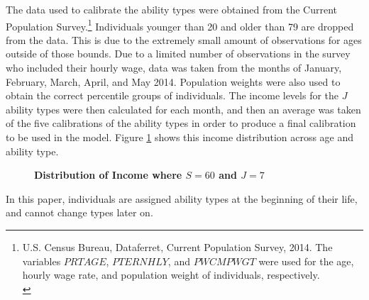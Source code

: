 \documentclass[letterpaper,12pt]{article}
\theoremstyle{definition}
\begin{document}
  The data used to calibrate the ability types were obtained from the Current Population Survey.\footnote{U.S. Census Bureau, Dataferret, Current Population Survey, 2014. The variables $PRTAGE$, $PTERNHLY$, and $PWCMPWGT$ were used for the age, hourly wage rate, and population weight of individuals, respectively. \\ [-2pt]} Individuals younger than 20 and older than 79 are dropped from the data. This is due to the extremely small amount of observations for ages outside of those bounds. Due to a limited number of observations in the survey who included their hourly wage, data was taken from the months of January, February, March, April, and May 2014.  Population weights were also used to obtain the correct percentile groups of individuals.  The income levels for the $J$ ability types were then calculated for each month, and then an average was taken of the five calibrations of the ability types in order to produce a final calibration to be used in the model. Figure \ref{FigIncome} shows this income distribution across age and ability type.

    \begin{figure}[htb]\centering \captionsetup{width=4.0in}
      \caption{\label{FigIncome}\textbf{Distribution of Income where $S=60$ and $J=7$}}
    \end{figure}

  In this paper, individuals are assigned ability types at the beginning of their life, and cannot change types later on.


\newpage
\end{document}
